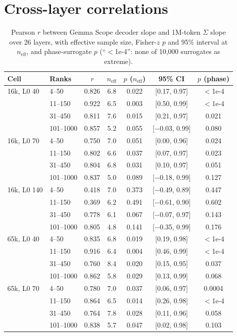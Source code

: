 \documentclass[10pt,twocolumn]{article}
\begin{document}
\section{Cross-layer correlations}
\label{app:r}

\begin{table}[h]
\centering
\small
\caption{Pearson $r$ between Gemma Scope decoder slope and 1M-token $\Sigma$ slope over 26 layers, with effective sample size, Fisher-$z$ $p$ and 95\% interval at $n_{\text{eff}}$, and phase-surrogate $p$ (``$<$1e-4'': none of 10,000 surrogates as extreme).}
\label{tab:rcells}
\begin{tabular}{llccccc}
\toprule
Cell & Ranks & $r$ & $n_{\text{eff}}$ & $p$ ($n_{\text{eff}}$) & 95\% CI & $p$ (phase) \\
\midrule
16k, L0 40 & 4--50 & 0.826 & 6.8 & 0.022 & [0.17, 0.97] & $<$1e-4 \\
 & 11--150 & 0.922 & 6.5 & 0.003 & [0.50, 0.99] & $<$1e-4 \\
 & 31--450 & 0.811 & 7.6 & 0.015 & [0.21, 0.97] & 0.021 \\
 & 101--1000 & 0.857 & 5.2 & 0.055 & [$-$0.03, 0.99] & 0.080 \\
16k, L0 70 & 4--50 & 0.750 & 7.0 & 0.051 & [0.00, 0.96] & 0.024 \\
 & 11--150 & 0.802 & 6.6 & 0.037 & [0.07, 0.97] & 0.023 \\
 & 31--450 & 0.804 & 6.8 & 0.031 & [0.10, 0.97] & 0.051 \\
 & 101--1000 & 0.837 & 5.0 & 0.089 & [$-$0.18, 0.99] & 0.127 \\
16k, L0 140 & 4--50 & 0.418 & 7.0 & 0.373 & [$-$0.49, 0.89] & 0.447 \\
 & 11--150 & 0.369 & 6.2 & 0.491 & [$-$0.61, 0.90] & 0.602 \\
 & 31--450 & 0.778 & 6.1 & 0.067 & [$-$0.07, 0.97] & 0.143 \\
 & 101--1000 & 0.805 & 4.8 & 0.141 & [$-$0.35, 0.99] & 0.176 \\
65k, L0 40 & 4--50 & 0.835 & 6.8 & 0.019 & [0.19, 0.98] & $<$1e-4 \\
 & 11--150 & 0.916 & 6.4 & 0.004 & [0.46, 0.99] & $<$1e-4 \\
 & 31--450 & 0.760 & 8.4 & 0.020 & [0.15, 0.95] & 0.037 \\
 & 101--1000 & 0.862 & 5.8 & 0.029 & [0.13, 0.99] & 0.068 \\
65k, L0 70 & 4--50 & 0.780 & 7.0 & 0.037 & [0.06, 0.97] & 0.0004 \\
 & 11--150 & 0.864 & 6.5 & 0.014 & [0.26, 0.98] & $<$1e-4 \\
 & 31--450 & 0.764 & 7.8 & 0.028 & [0.11, 0.96] & 0.058 \\
 & 101--1000 & 0.838 & 5.7 & 0.047 & [0.02, 0.98] & 0.103 \\
\bottomrule
\end{tabular}
\end{table}
\end{document}
